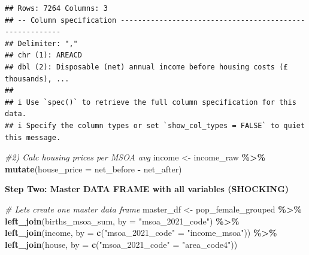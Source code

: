 \documentclass[
]{article}
\newenvironment{Shaded}{\begin{snugshade}}{\end{snugshade}}
\newcommand{\AttributeTok}[1]{\textcolor[rgb]{0.13,0.29,0.53}{#1}}
\newcommand{\CommentTok}[1]{\textcolor[rgb]{0.56,0.35,0.01}{\textit{#1}}}
\newcommand{\FunctionTok}[1]{\textcolor[rgb]{0.13,0.29,0.53}{\textbf{#1}}}
\newcommand{\NormalTok}[1]{#1}
\newcommand{\OtherTok}[1]{\textcolor[rgb]{0.56,0.35,0.01}{#1}}
\newcommand{\SpecialCharTok}[1]{\textcolor[rgb]{0.81,0.36,0.00}{\textbf{#1}}}
\newcommand{\StringTok}[1]{\textcolor[rgb]{0.31,0.60,0.02}{#1}}
\begin{document}
\begin{verbatim}
## Rows: 7264 Columns: 3
## -- Column specification --------------------------------------------------------
## Delimiter: ","
## chr (1): AREACD
## dbl (2): Disposable (net) annual income before housing costs (£ thousands), ...
## 
## i Use `spec()` to retrieve the full column specification for this data.
## i Specify the column types or set `show_col_types = FALSE` to quiet this message.
\end{verbatim}

\begin{Shaded}
\begin{Highlighting}[]
\CommentTok{\#2) Calc housing prices per MSOA avg}
\NormalTok{income }\OtherTok{\textless{}{-}}\NormalTok{ income\_raw }\SpecialCharTok{\%\textgreater{}\%} 
  \FunctionTok{mutate}\NormalTok{(}\AttributeTok{house\_price =}\NormalTok{ net\_before }\SpecialCharTok{{-}}\NormalTok{ net\_after)}
\end{Highlighting}
\end{Shaded}

\textbf{Step Two: Master DATA FRAME with all variables (SHOCKING)}

\begin{Shaded}
\begin{Highlighting}[]
\CommentTok{\# Lets create one master data frame}
\NormalTok{master\_df }\OtherTok{\textless{}{-}}\NormalTok{ pop\_female\_grouped }\SpecialCharTok{\%\textgreater{}\%}
  \FunctionTok{left\_join}\NormalTok{(births\_msoa\_sum, }\AttributeTok{by =} \StringTok{"msoa\_2021\_code"}\NormalTok{) }\SpecialCharTok{\%\textgreater{}\%} 
  \FunctionTok{left\_join}\NormalTok{(income, }\AttributeTok{by =} \FunctionTok{c}\NormalTok{(}\StringTok{"msoa\_2021\_code"} \OtherTok{=} \StringTok{"income\_msoa"}\NormalTok{)) }\SpecialCharTok{\%\textgreater{}\%} 
  \FunctionTok{left\_join}\NormalTok{(house, }\AttributeTok{by =} \FunctionTok{c}\NormalTok{(}\StringTok{"msoa\_2021\_code"} \OtherTok{=} \StringTok{"area\_code4"}\NormalTok{))}
\end{Highlighting}
\end{Shaded}
\end{document}
